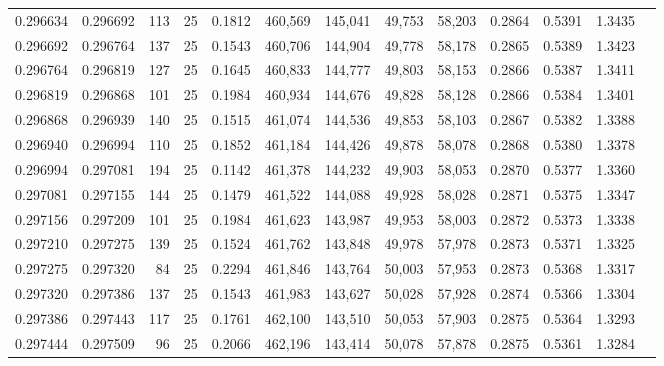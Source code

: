 \begin{tabular}{rrrrrrrrrrrrr}
0.296634 & 0.296692 &   113 &  25 &                                     0.1812 & 460,569 & 145,041 &  49,753 &  58,203 & 0.2864 & 0.5391 & 1.3435 \\
0.296692 & 0.296764 &   137 &  25 &                                     0.1543 & 460,706 & 144,904 &  49,778 &  58,178 & 0.2865 & 0.5389 & 1.3423 \\
0.296764 & 0.296819 &   127 &  25 &                                     0.1645 & 460,833 & 144,777 &  49,803 &  58,153 & 0.2866 & 0.5387 & 1.3411 \\
0.296819 & 0.296868 &   101 &  25 &                                     0.1984 & 460,934 & 144,676 &  49,828 &  58,128 & 0.2866 & 0.5384 & 1.3401 \\
0.296868 & 0.296939 &   140 &  25 &                                     0.1515 & 461,074 & 144,536 &  49,853 &  58,103 & 0.2867 & 0.5382 & 1.3388 \\
0.296940 & 0.296994 &   110 &  25 &                                     0.1852 & 461,184 & 144,426 &  49,878 &  58,078 & 0.2868 & 0.5380 & 1.3378 \\
0.296994 & 0.297081 &   194 &  25 &                                     0.1142 & 461,378 & 144,232 &  49,903 &  58,053 & 0.2870 & 0.5377 & 1.3360 \\
0.297081 & 0.297155 &   144 &  25 &                                     0.1479 & 461,522 & 144,088 &  49,928 &  58,028 & 0.2871 & 0.5375 & 1.3347 \\
0.297156 & 0.297209 &   101 &  25 &                                     0.1984 & 461,623 & 143,987 &  49,953 &  58,003 & 0.2872 & 0.5373 & 1.3338 \\
0.297210 & 0.297275 &   139 &  25 &                                     0.1524 & 461,762 & 143,848 &  49,978 &  57,978 & 0.2873 & 0.5371 & 1.3325 \\
0.297275 & 0.297320 &    84 &  25 &                                     0.2294 & 461,846 & 143,764 &  50,003 &  57,953 & 0.2873 & 0.5368 & 1.3317 \\
0.297320 & 0.297386 &   137 &  25 &                                     0.1543 & 461,983 & 143,627 &  50,028 &  57,928 & 0.2874 & 0.5366 & 1.3304 \\
0.297386 & 0.297443 &   117 &  25 &                                     0.1761 & 462,100 & 143,510 &  50,053 &  57,903 & 0.2875 & 0.5364 & 1.3293 \\
0.297444 & 0.297509 &    96 &  25 &                                     0.2066 & 462,196 & 143,414 &  50,078 &  57,878 & 0.2875 & 0.5361 & 1.3284 \\

\end{tabular}
